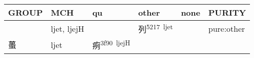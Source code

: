 \documentclass[14pt,a4paper]{scrartcl}
\begin{document}
\begin{longtable}[c]{@{}llllll@{}}
\toprule
\begin{minipage}[b]{0.14\columnwidth}\raggedright\strut
GROUP
\strut\end{minipage} &
\begin{minipage}[b]{0.14\columnwidth}\raggedright\strut
MCH
\strut\end{minipage} &
\begin{minipage}[b]{0.14\columnwidth}\raggedright\strut
qu
\strut\end{minipage} &
\begin{minipage}[b]{0.14\columnwidth}\raggedright\strut
other
\strut\end{minipage} &
\begin{minipage}[b]{0.14\columnwidth}\raggedright\strut
none
\strut\end{minipage} &
\begin{minipage}[b]{0.14\columnwidth}\raggedright\strut
PURITY
\strut\end{minipage}\tabularnewline
\midrule
\endhead
\begin{minipage}[t]{0.14\columnwidth}\raggedright\strut
𡿩
\strut\end{minipage} &
\begin{minipage}[t]{0.14\columnwidth}\raggedright\strut
ljet, ljejH
\strut\end{minipage} &
\begin{minipage}[t]{0.14\columnwidth}\raggedright\strut
\strut\end{minipage} &
\begin{minipage}[t]{0.14\columnwidth}\raggedright\strut
列\textsuperscript{5217~ljet}
\strut\end{minipage} &
\begin{minipage}[t]{0.14\columnwidth}\raggedright\strut
\strut\end{minipage} &
\begin{minipage}[t]{0.14\columnwidth}\raggedright\strut
pure:other
\strut\end{minipage}\tabularnewline
\begin{minipage}[t]{0.14\columnwidth}\raggedright\strut
蠆
\strut\end{minipage} &
\begin{minipage}[t]{0.14\columnwidth}\raggedright\strut
ljet
\strut\end{minipage} &
\begin{minipage}[t]{0.14\columnwidth}\raggedright\strut
㾐\textsuperscript{3f90~ljejH}
\strut\end{minipage} &

\end{longtable}
\end{document}
